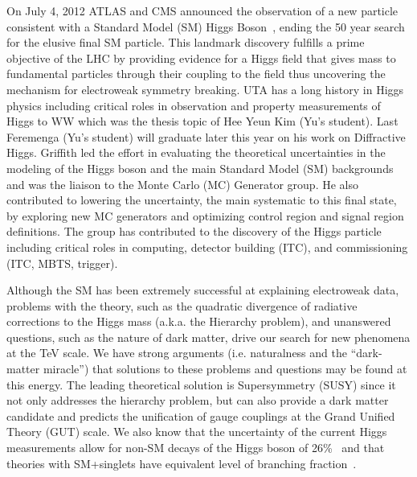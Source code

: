 On July 4, 2012 ATLAS and CMS announced the observation of a new
particle consistent with a Standard Model (SM) Higgs
Boson~\cite{ATLAS-Higgs-Observation, CMS-Higgs-Observation}, ending
the 50 year search for the elusive final SM particle. This landmark
discovery fulfills a prime objective of the LHC by providing evidence
for a Higgs field that gives mass to fundamental particles through
their coupling to the field thus uncovering the mechanism for
electroweak symmetry breaking.  UTA has a long history in Higgs
physics including critical roles in observation and property
measurements of Higgs to WW which was the thesis topic of Hee Yeun Kim
(Yu's student).  Last Feremenga (Yu's student) will graduate later
this year on his work on Diffractive Higgs.  Griffith led the effort
in evaluating the theoretical uncertainties in the modeling of the
Higgs boson and the main Standard Model (SM) backgrounds and was the
liaison to the Monte Carlo (MC) Generator group. He also contributed
to lowering the uncertainty, the main systematic to this final state,
by exploring new MC generators and optimizing control region and
signal region definitions.  The group has contributed to the discovery
of the Higgs particle including critical roles in computing, detector
building (ITC), and commissioning (ITC, MBTS, trigger).

Although the SM has been extremely successful at explaining electroweak data, problems with the theory, such as the quadratic divergence of radiative corrections to the Higgs mass (a.k.a. the Hierarchy problem), and unanswered questions, such as the nature of dark matter, drive our search for new phenomena at the TeV scale. We have strong arguments (i.e. naturalness and the ``dark-matter miracle'') 
that solutions to these problems and questions may be found at this energy. 
The leading theoretical solution is Supersymmetry (SUSY) since it not only addresses the hierarchy problem, but can also provide a dark matter candidate and predicts the unification of gauge couplings at the Grand Unified Theory (GUT) scale.
We also know that the uncertainty of the current Higgs measurements allow for non-SM decays of the Higgs boson of 26\%~\cite{combin} and that theories with SM+singlets have equivalent level of branching fraction~\cite{exohiggs}.

